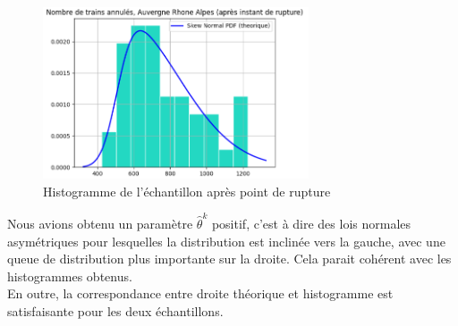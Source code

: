 {\begin{figure}[H]
  \centering
  \includegraphics[width=0.7\textwidth]{image/ARA_TA_5.png}
  \caption{Histogramme de l'échantillon après point de rupture}
\end{figure}

Nous avions obtenu un paramètre $\hat{\theta}^k$ positif, c'est à dire des lois normales asymétriques pour lesquelles la distribution est inclinée vers la gauche, avec une queue de distribution plus importante sur la droite. Cela parait cohérent avec les histogrammes obtenus. \\

En outre, la correspondance entre droite théorique et histogramme est satisfaisante pour les deux échantillons.

}